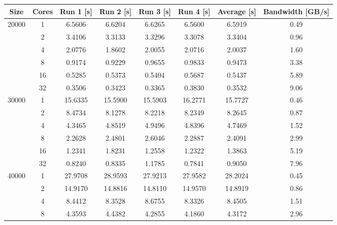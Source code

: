\begin{tabularx}{\textwidth}{@{} c c c c c c c c @{}}
    \caption{\label{table:transposition}Matrix transposition - run times and bandwidth}\\
    \toprule
        \textbf{Size} & \textbf{Cores} & \textbf{Run 1 [s]} & \textbf{Run 2 [s]} & %
        \textbf{Run 3 [s]} & \textbf{Run 4 [s]} & \textbf{Average [s]} & \textbf{Bandwidth [GB/s]}\\
    \midrule
    \endhead
        \multirow{6}{*}{20000} & 1  & 6.5606 & 6.6204 & 6.6265 & 6.5600 & 6.5919 & 0.49 \\
                               & 2  & 3.4106 & 3.3133 & 3.3296 & 3.3078 & 3.3404 & 0.96 \\
                               & 4  & 2.0776 & 1.8602 & 2.0055 & 2.0716 & 2.0037 & 1.60 \\
                               & 8  & 0.9174 & 0.9229 & 0.9655 & 0.9833 & 0.9473 & 3.38 \\
                               & 16 & 0.5285 & 0.5373 & 0.5404 & 0.5687 & 0.5437 & 5.89 \\
                               & 32 & 0.3506 & 0.3423 & 0.3365 & 0.3830 & 0.3532 & 9.06 \\
    \midrule
        \multirow{6}{*}{30000} & 1  & 15.6335 & 15.5900 & 15.5903 & 16.2771 & 15.7727 & 0.46 \\
                               & 2  & 8.4734  & 8.1278  & 8.2218  & 8.2349  & 8.2645  & 0.87 \\
                               & 4  & 4.3465  & 4.8519  & 4.9496  & 4.8396  & 4.7469  & 1.52 \\
                               & 8  & 2.2628  & 2.4801  & 2.6046  & 2.2887  & 2.4091  & 2.99 \\
                               & 16 & 1.2341  & 1.8231  & 1.2558  & 1.2322  & 1.3863  & 5.19 \\
                               & 32 & 0.8240  & 0.8335  & 1.1785  & 0.7841  & 0.9050  & 7.96 \\
    \midrule
        \multirow{6}{*}{40000} & 1  & 27.9708 & 28.9593 & 27.9213 & 27.9582 & 28.2024 & 0.45 \\
                               & 2  & 14.9170 & 14.8816 & 14.8110 & 14.9570 & 14.8919 & 0.86 \\
                               & 4  & 8.4412  & 8.3528  & 8.6755  & 8.3326  & 8.4505  & 1.51 \\
                               & 8  & 4.3593  & 4.4382  & 4.2855  & 4.1860  & 4.3172  & 2.96 \\

\end{tabularx}
